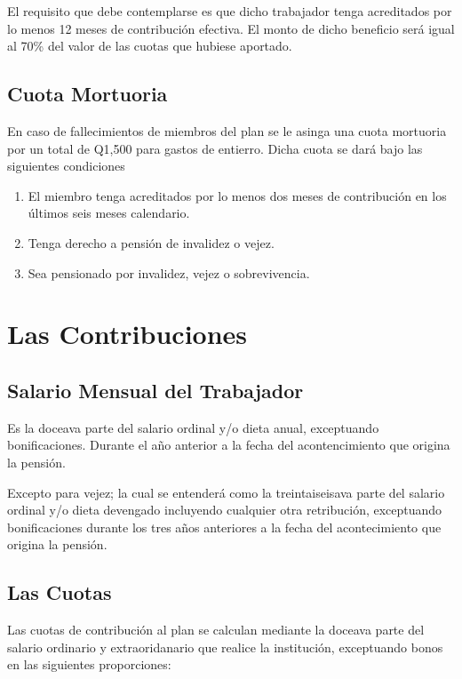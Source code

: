 \documentclass[12pt,letterpaper,titlepage]{article}
\begin{document}
El requisito que debe contemplarse es que dicho trabajador tenga acreditados por lo menos 12 meses de contribución efectiva. El monto de dicho beneficio será igual al 70\% del valor de las cuotas que hubiese aportado.

\subsection{Cuota Mortuoria}

En caso de fallecimientos de miembros del plan se le asinga una cuota mortuoria por un total de Q1,500 para gastos de entierro. Dicha cuota se dará bajo las siguientes condiciones 

\begin{enumerate}
	\item El miembro tenga acreditados por lo menos dos meses de contribución en los últimos seis meses calendario.
	\item Tenga derecho a pensión de invalidez o vejez.
	\item Sea pensionado por invalidez, vejez o sobrevivencia.
\end{enumerate}


\section{Las Contribuciones}

\subsection{Salario Mensual del Trabajador}

Es la doceava parte del salario ordinal y/o dieta anual, exceptuando bonificaciones. Durante el año anterior a la fecha del acontencimiento que origina la pensión. 

Excepto para vejez; la cual se entenderá como la treintaiseisava parte del salario ordinal y/o dieta devengado incluyendo cualquier otra retribución, exceptuando bonificaciones durante los tres años anteriores a la fecha del acontecimiento que origina la pensión.

\subsection{Las Cuotas}

Las cuotas de contribución al plan se calculan mediante la doceava parte del salario ordinario y extraoridanario que realice la institución, exceptuando bonos en las siguientes proporciones:
\end{document}
